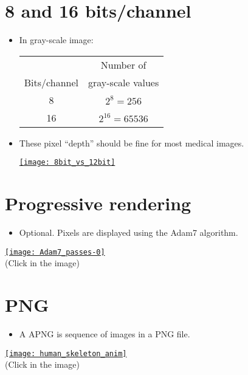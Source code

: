 \section{8 and 16 bits/channel}
\begin{itemize}
\item In gray-scale image:
  \begin{center}
    \begin{tabular}{c|c}
      & Number of \\
      Bits/channel & gray-scale values \\
      \hline
      8 & $2^8=256$ \\
      16 & $2^{16}=65536$
    \end{tabular}
  \end{center}
\item These pixel ``depth'' should be fine for most medical images.
  \begin{center}
    \href{https://www.fastcompression.com/blog/jpeg2000-applications-part1.htm}{\texttt{[image: 8bit\_vs\_12bit]}}
  \end{center}
\end{itemize}

\section{Progressive rendering}
\begin{itemize}
\item Optional. Pixels are displayed using the Adam7 algorithm.
\end{itemize}
\begin{center}
  \href{https://upload.wikimedia.org/wikipedia/commons/2/27/Adam7_passes.gif}{\texttt{[image: Adam7\_passes-0]}} \\
  (Click in the image)
\end{center}
  
\section{ PNG}
\begin{itemize}
\item A \gls{APNG} is sequence of images in a \gls{PNG} file.
\end{itemize}
\begin{center}
  \href{https://commons.wikimedia.org/wiki/Category:Animated_PNG_files#/media/File:201805_human_skeleton_anim.png}{\texttt{[image: human\_skeleton\_anim]}} \\
  (Click in the image)
\end{center}

